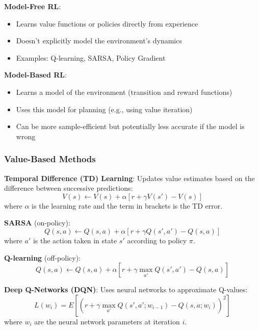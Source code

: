 \documentclass{article}
\begin{document}
\textbf{Model-Free RL}:
\begin{itemize}
    \item Learns value functions or policies directly from experience
    \item Doesn't explicitly model the environment's dynamics
    \item Examples: Q-learning, SARSA, Policy Gradient
\end{itemize}

\textbf{Model-Based RL}:
\begin{itemize}
    \item Learns a model of the environment (transition and reward functions)
    \item Uses this model for planning (e.g., using value iteration)
    \item Can be more sample-efficient but potentially less accurate if the model is wrong
\end{itemize}

\subsubsection{Value-Based Methods}

\textbf{Temporal Difference (TD) Learning}:
Updates value estimates based on the difference between successive predictions:
\begin{equation}
    V(s) \leftarrow V(s) + \alpha [r + \gamma V(s') - V(s)]
\end{equation}
where $\alpha$ is the learning rate and the term in brackets is the TD error.

\textbf{SARSA} (on-policy):
\begin{equation}
    Q(s,a) \leftarrow Q(s,a) + \alpha [r + \gamma Q(s',a') - Q(s,a)]
\end{equation}
where $a'$ is the action taken in state $s'$ according to policy $\pi$.

\textbf{Q-learning} (off-policy):
\begin{equation}
    Q(s,a) \leftarrow Q(s,a) + \alpha [r + \gamma \max_{a'} Q(s',a') - Q(s,a)]
\end{equation}

\textbf{Deep Q-Networks (DQN)}:
Uses neural networks to approximate Q-values:
\begin{equation}
    L(w_i) = E[(r + \gamma \max_{a'} Q(s',a'; w_{i-1}) - Q(s,a; w_i))^2]
\end{equation}
where $w_i$ are the neural network parameters at iteration $i$.
\end{document}
